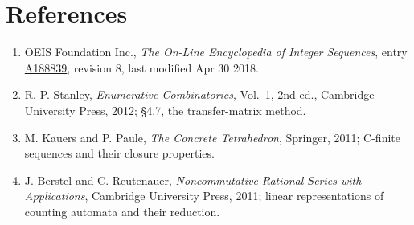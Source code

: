\documentclass[11pt]{article}
\theoremstyle{definition}
\begin{document}
\section{References}

\begin{enumerate}

\item OEIS Foundation Inc., \emph{The On-Line Encyclopedia of Integer Sequences}, entry \href{https://oeis.org/A188839}{A188839}, revision 8, last modified Apr 30 2018.

\item R. P. Stanley, \emph{Enumerative Combinatorics}, Vol.~1, 2nd ed., Cambridge University Press, 2012; \S4.7, the transfer-matrix method.

\item M. Kauers and P. Paule, \emph{The Concrete Tetrahedron}, Springer, 2011; C-finite sequences and their closure properties.

\item J. Berstel and C. Reutenauer, \emph{Noncommutative Rational Series with Applications}, Cambridge University Press, 2011; linear representations of counting automata and their reduction.

\end{enumerate}
\end{document}
